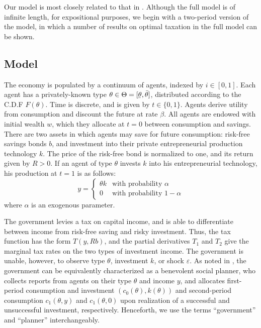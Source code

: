 \documentclass[11pt]{article}
\newcommand{\ubar}[1]{\underaccent{\bar}{#1}}
\begin{document}
Our model is most closely related to that in \cite{shourideh2014optimal}. Although the full model is of infinite length, for expositional purposes, we begin with a two-period version of the model, in which a number of results on optimal taxation in the full model can be shown. 

\subsection{Model} \label{sec:two_pd_model}

The economy is populated by a continuum of agents, indexed by \( i\in[0,1] \). Each agent has a privately-known type \( \theta\in\Theta=[\ubar{\theta},\bar{\theta}] \), distributed according to the C.D.F \( F(\theta) \). Time is discrete, and is given by \( t\in\{0,1\} \). Agents derive utility from consumption and discount the future at rate \( \beta \). All agents are endowed with initial wealth \( w \), which they allocate at \( t = 0 \) between consumption and savings. There are two assets in which agents may save for future consumption: risk-free savings bonds \( b \), and investment into their private entrepreneurial production technology \( k \). The price of the risk-free bond is normalized to one, and its return given by \( R > 0 \). If an agent of type \( \theta \) invests \( k \) into his entrepreneurial technology, his production at \( t = 1 \) is as follows:
\begin{equation}
    y = \begin{cases}
        \theta k & \text{with probability }\alpha \\
        0 & \text{with probability }1 - \alpha
    \end{cases}
\end{equation}
where \( \alpha \) is an exogenous parameter. 

The government levies a tax on capital income, and is able to differentiate between income from risk-free saving and risky investment. Thus, the tax function has the form \( T(y,Rb) \), and the partial derivatives \( T_1 \) and \( T_2 \) give the marginal tax rates on the two types of investment income. The government is unable, however, to observe type \( \theta \), investment \( k \), or shock \( \varepsilon \). As noted in \cite{mirrlees1971exploration}, the government can be equivalently characterized as a benevolent social planner, who collects reports from agents on their type \( \theta \) and income \( y \), and allocates first-period consumption and investment \( \left( c_0(\theta),k(\theta) \right) \) and second-period consumption \( c_1(\theta,y) \) and \( c_1(\theta,0) \) upon realization of a successful and unsuccessful investment, respectively. Henceforth, we use the terms ``government'' and ``planner'' interchangeably. 
\end{document}
